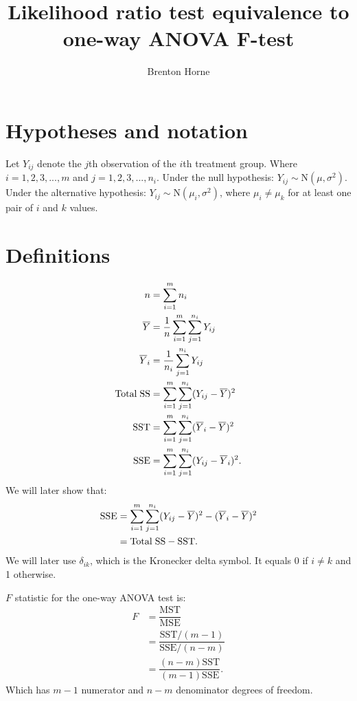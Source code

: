 \documentclass[12pt,a4paper,openright]{article}
\title{Likelihood ratio test equivalence to one-way ANOVA F-test}
\author{Brenton Horne}
\newcommand{\ovY}{\overline{Y}}
\newcommand{\MSE}{\mathrm{MSE}}
\newcommand{\SST}{\mathrm{SST}}
\newcommand{\MST}{\mathrm{MST}}
\newcommand{\SSE}{\mathrm{SSE}}
\newcommand{\SSTotal}{\mathrm{Total\hspace{0.1cm}SS}}
\begin{document}
	\maketitle
	
	\tableofcontents
	
	\newpage
	
	\section{Hypotheses and notation}
	Let $Y_{ij}$ denote the $j$th observation of the $i$th treatment group. Where $i=1, 2, 3, ..., m$ and $j=1, 2, 3, ..., n_i$. Under the null hypothesis: $Y_{ij} \sim \mathrm{N}(\mu, \sigma^2)$. Under the alternative hypothesis: $Y_{ij} \sim \mathrm{N}(\mu_i, \sigma^2)$, where $\mu_i \neq \mu_k$ for at least one pair of $i$ and $k$ values.
	
	\section{Definitions}
	\begin{align*}
		n &= \sum_{i=1}^m n_i \\
		\overline{Y} &= \dfrac{1}{n} \sum_{i=1}^m \sum_{j=1}^{n_i} Y_{ij} \\
		\overline{Y}_i &= \dfrac{1}{n_i} \sum_{j=1}^{n_i} Y_{ij} \\
		\SSTotal &= \sum_{i=1}^m \sum_{j=1}^{n_i} (Y_{ij}-\ovY)^2 \\
		\SST &= \sum_{i=1}^m \sum_{j=1}^{n_i} (\ovY_i-\ovY)^2 \\
		\SSE &= \sum_{i=1}^m \sum_{j=1}^{n_i} (Y_{ij}-\ovY_i)^2.
	\end{align*}
	We will later show that:
	\begin{align*}
		\SSE &= \sum_{i=1}^m \sum_{j=1}^{n_i} (Y_{ij}-\ovY)^2 - (\ovY_i-\ovY)^2 \\
		&= \SSTotal - \SST.
	\end{align*}
	We will later use $\delta_{ik}$, which is the Kronecker delta symbol. It equals 0 if $i\neq k$ and 1 otherwise.
	
	$F$ statistic for the one-way ANOVA test is:
	\begin{align*}
		F &= \dfrac{\MST}{\MSE} \\
		&= \dfrac{\SST/(m-1)}{\SSE/(n-m)} \\
		&= \dfrac{(n-m)\SST}{(m-1)\SSE}.
	\end{align*}
	Which has $m-1$ numerator and $n-m$ denominator degrees of freedom.
	
\end{document}
